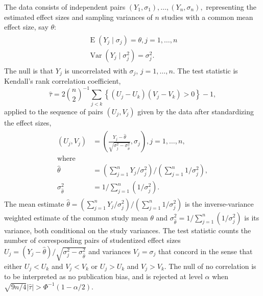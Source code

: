 \documentclass[12pt]{article}
\newcommand{\y}{Y}
\renewcommand{\u}{U}
\renewcommand{\v}{V}
\DeclareMathOperator{\E}{E}
\DeclareMathOperator{\V}{Var}
\begin{document}
    The data consists of independent pairs
    $(\y_1,\sigma_1),\ldots,(\y_n,\sigma_n),$ representing the estimated
    effect sizes and sampling variances of $n$ studies with a common mean effect size, say $\theta$:
    \begin{align}
      \begin{split}
      \E(\y_j\mid\sigma_j)=\theta, j=1,\ldots,n\\
      \V(\y_j\mid\sigma_j^2)=\sigma_j^2.
      \label{model:nonpara}
    \end{split}
    \end{align}
    The null is that $\y_j$ is uncorrelated with $\sigma_j$, $j=1,\ldots,n$.
    The test statistic is Kendall's rank
    correlation coefficient,
    $$
    \hat\tau=2{n\choose 2}^{-1}\sum_{j<k}\left\{(\u_j-\u_k)(\v_j-\v_k)>0\right\} - 1,
    $$
    applied to the sequence of pairs $(\u_j,\v_j)$ given by the data after standardizing the effect sizes,
    \begin{align}
      \begin{split}\label{defn:pairs}
        (\u_j,\v_j)&=\left(\frac{\y_j-\hat{\theta}}{\sqrt{\sigma_j^2-\sigma^2_{\hat{\theta}}}},\sigma_j\right),j=1,\ldots,n,\\
        \text{where}\\
        \hat{\theta}&=(\sum_{j=1}^n\y_j/\sigma^2_j)/(\sum_{j=1}^n1/\sigma_j^2),\\
        \sigma^2_{\hat{\theta}}&=1/\sum_{j=1}^n(1/\sigma_j^2).
      \end{split}
    \end{align}
    The mean estimate
    $\hat{\theta}=(\sum_{j=1}^n\y_j/\sigma^2_j)/(\sum_{j=1}^n1/\sigma_j^2)$
    is the inverse-variance weighted estimate of the common study mean
    $\theta$ and $\sigma^2_{\hat{\theta}}=1/\sum_{j=1}^n(1/\sigma_j^2)$
    is its variance, both conditional on the study variances.  The
    test statistic counts the number of corresponding pairs of
    studentized effect sizes
    $\u_j=(\y_j-\hat{\theta})/\sqrt{\sigma_j^2-\sigma^2_{\hat{\theta}}}$
    and variances $\v_j=\sigma_j$ that concord in
    the sense that either $\u_j<\u_k$ and $\v_j<\v_k$ or $\u_j>\u_k$ and
    $\v_j>\v_k$. The null of no correlation is to be interpreted as no
    publication bias, and is rejected at level $\alpha$ when
    $\sqrt{9n/4}|\hat\tau| > \Phi^{-1}(1-\alpha/2)$. %
\end{document}
